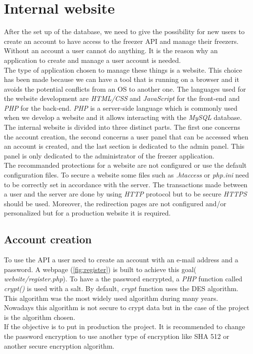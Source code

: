 \section{Internal website}
After the set up of the database, we need to give the possibility for new users to create an account to have access to the freezer API and manage their freezers. Without an account a user cannot do anything. It is the reason why an application to create and manage a user account is needed.\\

The type of application chosen to manage these things is a website. This choice has been made because we can have a tool that is running on a browser and it avoids the potential conflicts from an OS to another one. The languages used for the website development are \textit{HTML/CSS} and \textit{JavaScript} for the front-end and \textit{PHP} for the back-end. \textit{PHP} is a server-side language which is commonly used when we develop a website and it allows interacting with the \textit{MySQL} database. \\

The internal website is divided into three distinct parts. The first one concerns the account creation, the second concerns a user panel that can be accessed when an account is created, and the last section is dedicated to the admin panel. This panel is only dedicated to the administrator of the freezer application. \\

The recommanded protections for a website are not configured or use the default configuration files. To secure a website some files such as \textit{.htaccess} or \textit{php.ini} need to be correctly set in accordance with the server. The transactions made between a user and the server are done by using \textit{HTTP} protocol but to be secure \textit{HTTPS} should be used. Moreover, the redirection pages are not configured and/or personalized but for a production website it is required.

\subsection{Account creation}
To use the API a user need to create an account with an e-mail address and a password. A webpage (\autoref{fig:register}) is built to achieve this goal( \textit{website/register.php}). To have a the password encrypted, a \textit{PHP} function called \textit{crypt()} is used with a salt. By default, \textit{crypt} function uses the DES algorithm. This algorithm was the most widely used algorithm during many years. Nowadays this algorithm is not secure to crypt data but in the case of the project is the algorithm chosen.\\
If the objective is to put in production the project. It is recommended to change the password encryption to use another type of encryption like SHA 512 or another secure encryption algorithm.\\

